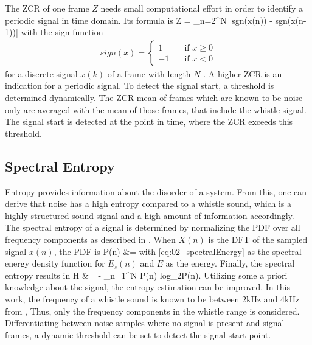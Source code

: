 The \ac{ZCR} of one frame $Z$ needs small computational effort in order to
identify a periodic signal in time domain.
Its formula is
\bal
    Z = \sum_{n=2}^N |sgn(x(n)) - sgn(x(n-1))|
    \label{eq:02_zcr}
\eal
with the sign function
\begin{align*}
    sign(x) =
    \begin{cases}
        1 & \quad \text{if } x\geq 0 \\
        -1 & \quad \text{if } x < 0
    \end{cases}
\end{align*}
for a discrete signal $x(k)$ of a frame with length $N$ \cite{Z_W_voiceActivity}.
A higher \ac{ZCR} is an indication for a periodic signal.
To detect the signal start, a threshold is determined dynamically.
The \ac{ZCR} mean of frames which are known to be noise only
are averaged with the mean of those frames, that include the whistle signal.
The signal start is detected at the point in time, where the \ac{ZCR} exceeds
this threshold.

\subsection{Spectral Entropy}
\label{subsec:02_Entropy}

Entropy provides information about the disorder of a system.
From this, one can derive that noise has a high entropy compared to
a whistle sound, which is a highly structured sound signal and a high
amount of information accordingly.
The spectral entropy of a signal is determined by normalizing the
\ac{PDF} over all frequency components as described in \cite{S_J_entropy}.
When $X(n)$ is the \ac{DFT} of the sampled signal $x(n)$, the \ac{PDF} is
\bal
    P(n) &= 
    \label{eq:02_pdf}
\eal
with \cref{eq:02_spectralEnergy} as the spectral energy density function for $E_s(n)$
and $E$ as the energy.
Finally, the spectral entropy results in
\bal
    H &= - \sum_{n=1}^N P(n) log_2P(n).
    \label{eq:02_entropy}
\eal
Utilizing some a priori knowledge about the signal, the entropy estimation
can be improved.
In this work, the frequency of a whistle sound is known to be
between $2\si{\kilo\hertz}$ and $4\si{\kilo\hertz}$ from \cite{Hasselbring},
Thus, only the frequency components in the whistle range is considered.
Differentiating between noise samples where no signal is present and
signal frames, a dynamic threshold can be set to detect the signal start point.
